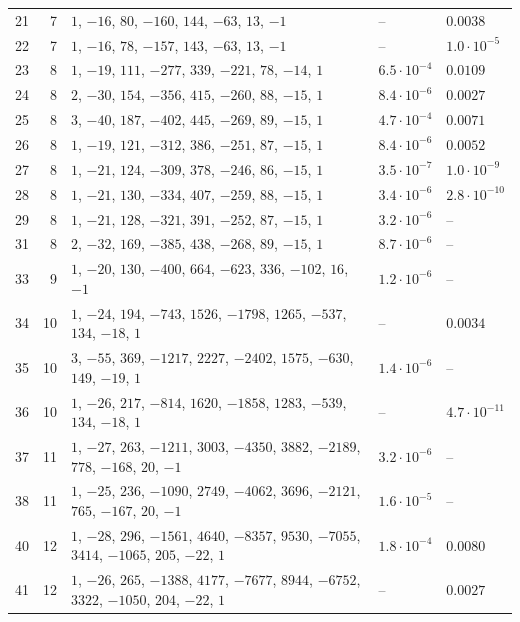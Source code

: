 \documentclass[11pt]{amsart}
\theoremstyle{remark}
\numberwithin{equation}{section}
\begin{document}
\begin{table}[p]
\begin{tabular}{@{}rr>{\raggedright\arraybackslash}p{}ll@{}}
21 & 7 & $1$, $-16$, $80$, $-160$, $144$, $-63$, $13$, $-1$ & -- & $0.0038$\\
22 & 7 & $1$, $-16$, $78$, $-157$, $143$, $-63$, $13$, $-1$ & -- & $1.0\cdot10^{-5}$\\
23 & 8 & $1$, $-19$, $111$, $-277$, $339$, $-221$, $78$, $-14$, $1$ & $6.5\cdot10^{-4}$ & $0.0109$\\
24 & 8 & $2$, $-30$, $154$, $-356$, $415$, $-260$, $88$, $-15$, $1$ & $8.4\cdot10^{-6}$ & $0.0027$\\
25 & 8 & $3$, $-40$, $187$, $-402$, $445$, $-269$, $89$, $-15$, $1$ & $4.7\cdot10^{-4}$ & $0.0071$\\
26 & 8 & $1$, $-19$, $121$, $-312$, $386$, $-251$, $87$, $-15$, $1$ & $8.4\cdot10^{-6}$ & $0.0052$\\
27 & 8 & $1$, $-21$, $124$, $-309$, $378$, $-246$, $86$, $-15$, $1$ & $3.5\cdot10^{-7}$ & $1.0\cdot10^{-9}$\\
28 & 8 & $1$, $-21$, $130$, $-334$, $407$, $-259$, $88$, $-15$, $1$ & $3.4\cdot10^{-6}$ & $2.8\cdot10^{-10}$\\
29 & 8 & $1$, $-21$, $128$, $-321$, $391$, $-252$, $87$, $-15$, $1$ & $3.2\cdot10^{-6}$ & --\\
31 & 8 & $2$, $-32$, $169$, $-385$, $438$, $-268$, $89$, $-15$, $1$ & $8.7\cdot10^{-6}$ & --\\
33 & 9 & $1$, $-20$, $130$, $-400$, $664$, $-623$, $336$, $-102$, $16$, $-1$ & $1.2\cdot10^{-6}$ & --\\
34 & 10 & $1$, $-24$, $194$, $-743$, $1526$, $-1798$, $1265$, $-537$, $134$, $-18$, $1$ & -- & $0.0034$\\
35 & 10 & $3$, $-55$, $369$, $-1217$, $2227$, $-2402$, $1575$, $-630$, $149$, $-19$, $1$ & $1.4\cdot10^{-6}$ & --\\
36 & 10 & $1$, $-26$, $217$, $-814$, $1620$, $-1858$, $1283$, $-539$, $134$, $-18$, $1$ & -- & $4.7\cdot10^{-11}$\\
37 & 11 & $1$, $-27$, $263$, $-1211$, $3003$, $-4350$, $3882$, $-2189$, $778$, $-168$, $20$, $-1$ & $3.2\cdot10^{-6}$ & --\\
38 & 11 & $1$, $-25$, $236$, $-1090$, $2749$, $-4062$, $3696$, $-2121$, $765$, $-167$, $20$, $-1$ & $1.6\cdot10^{-5}$ & --\\
40 & 12 & $1$, $-28$, $296$, $-1561$, $4640$, $-8357$, $9530$, $-7055$, $3414$, $-1065$, $205$, $-22$, $1$ & $1.8\cdot10^{-4}$ & $0.0080$\\
41 & 12 & $1$, $-26$, $265$, $-1388$, $4177$, $-7677$, $8944$, $-6752$, $3322$, $-1050$, $204$, $-22$, $1$ & -- & $0.0027$\\

\end{tabular}
\end{table}
\end{document}

